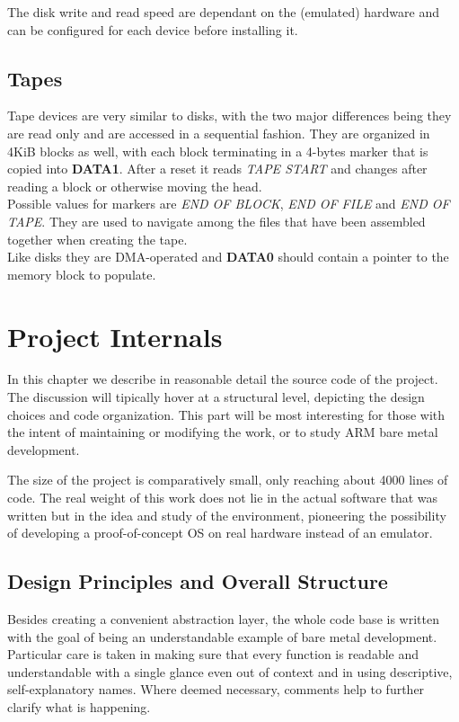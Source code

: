 \documentclass[12pt,a4paper,openright,twoside]{report}
\begin{document}
The disk write and read speed are dependant on the (emulated) hardware and can 
be configured for each device before installing it.

\section{Tapes}
Tape devices are very similar to disks, with the two major differences being they
are read only and are accessed in a sequential fashion.
They are organized in 4KiB blocks as well, with each block terminating in a
4-bytes marker that is copied into \textbf{DATA1}. After a reset it reads 
\textit{TAPE START} and changes after reading a block or otherwise moving the
head. \\
Possible values for markers are \textit{END OF BLOCK}, \textit{END OF FILE}
and \textit{END OF TAPE}. They are used to navigate among the files that have
been assembled together when creating the tape.\\
Like disks they are DMA-operated and \textbf{DATA0} should contain a pointer 
to the memory block to populate.

\clearpage{\pagestyle{empty}\cleardoublepage}
\chapter{Project Internals}
In this chapter we describe in reasonable detail the source code of the 
project. The discussion will tipically hover at a structural level, depicting 
the design choices and code organization. This part will be most interesting for
those with the intent of maintaining or modifying the work, or to study ARM
bare metal development.

The size of the project is comparatively small, only reaching about 4000 lines of 
code. The real weight of this work does not lie in the actual software that was
written but in the idea and study of the environment, pioneering the possibility
of developing a proof-of-concept OS on real hardware instead of an emulator.

\section{Design Principles and Overall Structure}
Besides creating a convenient abstraction layer, the whole code base is written 
with the goal of being an understandable example of bare metal development. Particular 
care is taken in making sure that every function is readable and understandable
with a single glance even out of context and in using descriptive, self-explanatory
names. Where deemed necessary, comments help to further clarify what is happening.
\end{document}
